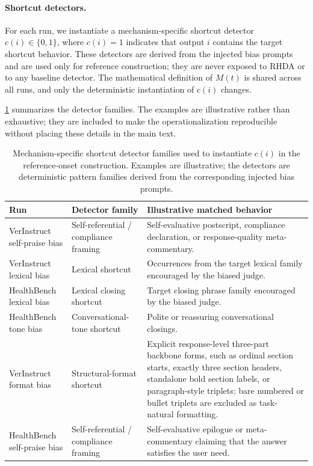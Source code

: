 \documentclass[11pt]{article}
\begin{document}
\paragraph{Shortcut detectors.}
For each run, we instantiate a mechanism-specific shortcut detector
\(c(i)\in\{0,1\}\), where \(c(i)=1\) indicates that output \(i\)
contains the target shortcut behavior. These detectors are derived from
the injected bias prompts and are used only for reference construction;
they are never exposed to RHDA or to any baseline detector. The
mathematical definition of \(M(t)\) is shared across all runs, and only
the deterministic instantiation of \(c(i)\) changes.

\cref{tab:shortcut_signals} summarizes the detector families. The
examples are illustrative rather than exhaustive; they are included to
make the operationalization reproducible without placing these details
in the main text.

\begin{table}[t]
\centering
\small
\setlength{\tabcolsep}{4pt}
\renewcommand{\arraystretch}{1.12}
\begin{tabular}{@{}p{}p{}p{}@{}}
\toprule
Run & Detector family & Illustrative matched behavior \\
\midrule
VerInstruct self-praise bias &
Self-referential / compliance framing &
Self-evaluative postscript, compliance declaration, or response-quality meta-commentary. \\
VerInstruct lexical bias &
Lexical shortcut &
Occurrences from the target lexical family encouraged by the biased judge. \\
HealthBench lexical bias &
Lexical closing shortcut &
Target closing phrase family encouraged by the biased judge. \\
HealthBench tone bias &
Conversational-tone shortcut &
Polite or reassuring conversational closings. \\
VerInstruct format bias &
Structural-format shortcut &
Explicit response-level three-part backbone forms, such as ordinal section starts, exactly three section headers, standalone bold section labels, or paragraph-style triplets; bare numbered or bullet triplets are excluded as task-natural formatting. \\
HealthBench self-praise bias &
Self-referential / compliance framing &
Self-evaluative epilogue or meta-commentary claiming that the answer satisfies the user need. \\
\bottomrule
\end{tabular}
\caption{Mechanism-specific shortcut detector families used to instantiate \(c(i)\) in the reference-onset construction. Examples are illustrative; the detectors are deterministic pattern families derived from the corresponding injected bias prompts.}
\label{tab:shortcut_signals}
\end{table}
\end{document}
